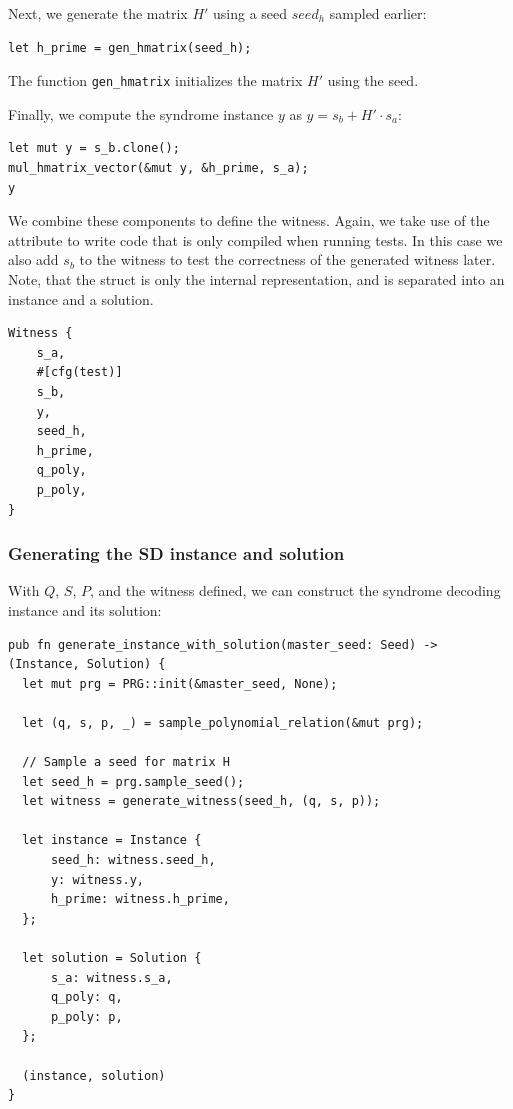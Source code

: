 \documentclass[11pt]{report}
\theoremstyle{definition}
\theoremstyle{plain}
\newcommand{\todo}[1]{{\color[rgb]{.5,0,0}\textbf{$\blacktriangleright$#1$\blacktriangleleft$}}}
\begin{document}
Next, we generate the matrix $H'$ using a seed $seed_h$ sampled earlier:

\begin{verbatim}
let h_prime = gen_hmatrix(seed_h);
\end{verbatim}

The function \texttt{gen\_hmatrix} initializes the matrix $H'$ using the seed.

Finally, we compute the syndrome instance $y$ as $y = s_b + H' \cdot s_a$:

\begin{verbatim}
let mut y = s_b.clone();
mul_hmatrix_vector(&mut y, &h_prime, s_a);
y
\end{verbatim}

We combine these components to define the witness. Again, we take use of the  attribute to write code that is only compiled when running tests. In this case we also add $s_b$ to the witness to test the correctness of the generated witness later. Note, that the  struct is only the internal representation, and is separated into an instance and a solution.

\begin{verbatim}
Witness {
    s_a,
    #[cfg(test)]
    s_b,
    y,
    seed_h,
    h_prime,
    q_poly,
    p_poly,
}
\end{verbatim}

\subsubsection{Generating the SD instance and solution}

With $Q$, $S$, $P$, and the witness defined, we can construct the syndrome decoding instance and its solution:

\begin{verbatim}
pub fn generate_instance_with_solution(master_seed: Seed) -> (Instance, Solution) {
  let mut prg = PRG::init(&master_seed, None);

  let (q, s, p, _) = sample_polynomial_relation(&mut prg);

  // Sample a seed for matrix H
  let seed_h = prg.sample_seed();
  let witness = generate_witness(seed_h, (q, s, p));

  let instance = Instance {
      seed_h: witness.seed_h,
      y: witness.y,
      h_prime: witness.h_prime,
  };

  let solution = Solution {
      s_a: witness.s_a,
      q_poly: q,
      p_poly: p,
  };

  (instance, solution)
}
\end{verbatim}
\end{document}
